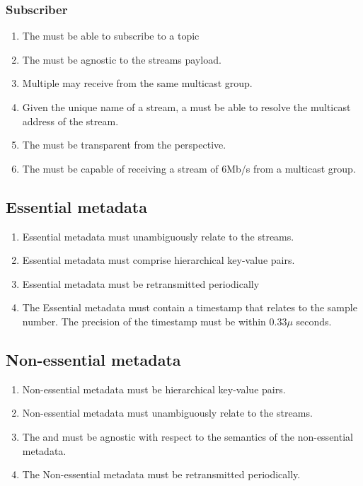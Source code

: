\subsubsection*{Subscriber}
\begin{enumerate}
	\item The \subs{} must be able to subscribe to a topic
	\item The \sub{} must be agnostic to the streams payload.
	\item Multiple \subs{} may receive from the same multicast group.
	\item Given the unique name of a stream, a  must be able to resolve the multicast address of the stream.
	\item The \sub{} must be transparent from the \con{} perspective.
	\item The \sub{} must be capable of receiving a stream of 6Mb/s from a multicast group.
\end{enumerate}

	

\subsection{Essential metadata}

\begin{enumerate}
	\item Essential metadata must unambiguously relate to the streams.
	\item Essential metadata must comprise hierarchical key-value pairs.
	\item Essential metadata must be retransmitted periodically
	\item The Essential metadata must contain a timestamp that relates to the sample number. The precision of the timestamp must be within $0.33\mu$ seconds.
\end{enumerate}

\subsection{Non-essential metadata}
\begin{enumerate}
	\item Non-essential metadata must be hierarchical key-value pairs.
	\item Non-essential metadata must unambiguously relate to the streams.
	\item The  and  must be agnostic with respect to the semantics of the non-essential metadata.
	\item The Non-essential metadata must be retransmitted periodically.
\end{enumerate}

